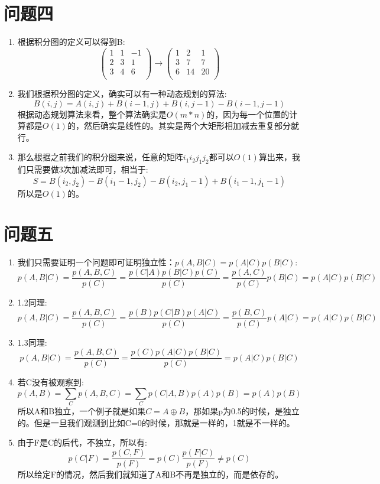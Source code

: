 \documentclass[answers]{exam}  %
\begin{document}
\section{问题四}
\begin{enumerate}[label=\alph*.] 
    \item 根据积分图的定义可以得到B:
    \[  
        \begin{pmatrix}
            1 & 1 & -1 \\
            2 & 3 & 1  \\
            3 & 4 & 6  \\
        \end{pmatrix}
        \rightarrow    
        \begin{pmatrix}
            1 & 2 & 1 \\ 
            3 & 7 & 7 \\
            6 & 14 & 20 \\
        \end{pmatrix}
    \]
    \item 我们根据积分图的定义，确实可以有一种动态规划的算法:
    \[
        B(i,j) = A(i, j) + B(i-1, j) + B(i,j -1) - B(i-1, j-1)
    \]
    根据动态规划算法来看，整个算法确实是$O(m*n)$的，因为每一个位置的计算都是$O(1)$的，然后确实是线性的。其实是两个大矩形相加减去重复部分就行。
    \item 那么根据之前我们的积分图来说，任意的矩阵$i_1i_2j_1j_2$都可以$O(1)$算出来，我们只需要做3次加减法即可，相当于:
    \[
        S  =B(i_2,j_2) - B(i_1- 1, j_2) - B(i_2, j_1-1) + B(i_1-1, j_1-1)
    \]  
    所以是$O(1)$的。
\end{enumerate}


\section{问题五}
\begin{enumerate}[label=\alph*.] 
    \item 我们只需要证明一个问题即可证明独立性：$p(A, B|C) = p(A|C)p(B|C)$:
    \[
        p(A, B|C) = \frac{p(A, B, C)}{p(C)} = \frac{p(C|A)p(B|C)p(C)}{p(C)} = \frac{p(A, C)}{p(C)} p(B|C)=p(A|C)p(B|C)
    \]
    \item 1.2同理:
    \[
        p(A, B|C) = \frac{p(A, B, C)}{p(C)} = \frac{p(B)p(C|B)p(A|C)}{p(C)} = \frac{p(B, C)}{p(C)} p(A|C)=p(A|C)p(B|C)
    \]
    \item 1.3同理:
    \[
        p(A, B|C) = \frac{p(A, B, C)}{p(C)} = \frac{p(C)p(A|C)p(B|C)}{p(C)} = p(A|C)p(B|C)
    \]
    \item 若C没有被观察到:
    \[
        p(A, B) = \sum_{C}p(A,B,C) = \sum_{C} p(C|A, B)p(A)p(B) = p(A)p(B) 
    \]
    所以A和B独立，一个例子就是如果$C = A\oplus B$，那如果p为0.5的时候，是独立的。但是一旦我们观测到比如C=0的时候，那就是一样的，1就是不一样的。
    \item 由于F是C的后代，不独立，所以有:
    \[
        p(C|F) = \frac{p(C, F)}{p(F)} = p(C) \frac{p(F|C)}{p(F)} \neq p(C)
    \]
    所以给定F的情况，然后我们就知道了A和B不再是独立的，而是依存的。
\end{enumerate}
\end{document}
